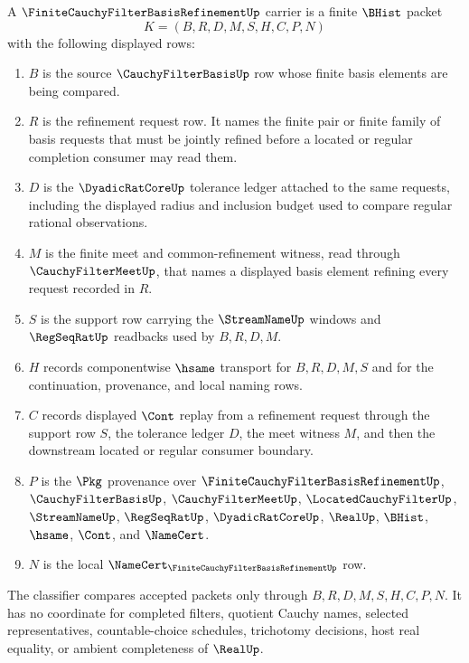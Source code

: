 \begin{definition}
\label{def:finite-cauchy-filter-basis-refinement-carrier}
A $\FiniteCauchyFilterBasisRefinementUp$ carrier is a finite $\BHist$ packet
$$
K=(B,R,D,M,S,H,C,P,N)
$$
with the following displayed rows:
\begin{enumerate}
\item $B$ is the source $\CauchyFilterBasisUp$ row whose finite basis elements are being compared.
\item $R$ is the refinement request row. It names the finite pair or finite family of basis requests that must be jointly refined before a located or regular completion consumer may read them.
\item $D$ is the $\DyadicRatCoreUp$ tolerance ledger attached to the same requests, including the displayed radius and inclusion budget used to compare regular rational observations.
\item $M$ is the finite meet and common-refinement witness, read through $\CauchyFilterMeetUp$, that names a displayed basis element refining every request recorded in $R$.
\item $S$ is the support row carrying the $\StreamNameUp$ windows and $\RegSeqRatUp$ readbacks used by $B,R,D,M$.
\item $H$ records componentwise $\hsame$ transport for $B,R,D,M,S$ and for the continuation, provenance, and local naming rows.
\item $C$ records displayed $\Cont$ replay from a refinement request through the support row $S$, the tolerance ledger $D$, the meet witness $M$, and then the downstream located or regular consumer boundary.
\item $P$ is the $\Pkg$ provenance over $\FiniteCauchyFilterBasisRefinementUp$, $\CauchyFilterBasisUp$, $\CauchyFilterMeetUp$, $\LocatedCauchyFilterUp$, $\StreamNameUp$, $\RegSeqRatUp$, $\DyadicRatCoreUp$, $\RealUp$, $\BHist$, $\hsame$, $\Cont$, and $\NameCert$.
\item $N$ is the local $\NameCert_{\FiniteCauchyFilterBasisRefinementUp}$ row.
\end{enumerate}
The classifier compares accepted packets only through $B,R,D,M,S,H,C,P,N$. It has no coordinate for completed filters, quotient Cauchy names, selected representatives, countable-choice schedules, trichotomy decisions, host real equality, or ambient completeness of $\RealUp$.
\end{definition}

